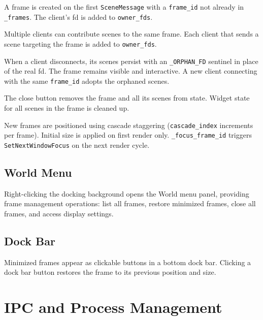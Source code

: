 \documentclass[a4paper,10pt]{article}
\newcommand{\msg}[1]{\texttt{#1}}
\newcommand{\field}[1]{\texttt{#1}}
\begin{document}
\begin{description}[style=nextline]
  \item[Creation]
    A frame is created on the first \msg{SceneMessage} with a
    \field{frame\_id} not already in \texttt{\_frames}.  The client's
    fd is added to \field{owner\_fds}.

  \item[Shared ownership]
    Multiple clients can contribute scenes to the same frame.  Each
    client that sends a scene targeting the frame is added to
    \field{owner\_fds}.

  \item[Orphan model]
    When a client disconnects, its scenes persist with an
    \texttt{\_ORPHAN\_FD} sentinel in place of the real fd.  The
    frame remains visible and interactive.  A new client connecting
    with the same \field{frame\_id} adopts the orphaned scenes.

  \item[Dismissal]
    The close button removes the frame and all its scenes from state.
    Widget state for all scenes in the frame is cleaned up.

  \item[Focus management]
    New frames are positioned using cascade staggering
    (\field{cascade\_index} increments per frame).  Initial size is
    applied on first render only.  \texttt{\_focus\_frame\_id} triggers
    \texttt{SetNextWindowFocus} on the next render cycle.
\end{description}

\subsection{World Menu}

Right-clicking the docking background opens the World menu panel,
providing frame management operations: list all frames, restore
minimized frames, close all frames, and access display settings.

\subsection{Dock Bar}

Minimized frames appear as clickable buttons in a bottom dock bar.
Clicking a dock bar button restores the frame to its previous
position and size.

\section{IPC and Process Management}
\end{document}
